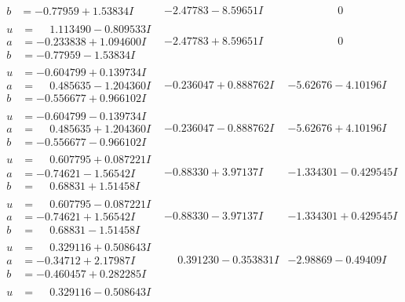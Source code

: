\documentclass[1p]{elsarticle_modified}
\theoremstyle{definition}
\begin{document}
$$\begin{array}{c|c|c}
\begin{aligned}
b &= -0.77959 + 1.53834 I\end{aligned}
 & -2.47783 - 8.59651 I & \phantom{-0.000000 } 0 \\ \hline\begin{aligned}
u &= \phantom{-}1.113490 - 0.809533 I \\
a &= -0.233838 + 1.094600 I \\
b &= -0.77959 - 1.53834 I\end{aligned}
 & -2.47783 + 8.59651 I & \phantom{-0.000000 } 0 \\ \hline\begin{aligned}
u &= -0.604799 + 0.139734 I \\
a &= \phantom{-}0.485635 - 1.204360 I \\
b &= -0.556677 + 0.966102 I\end{aligned}
 & -0.236047 + 0.888762 I & -5.62676 - 4.10196 I \\ \hline\begin{aligned}
u &= -0.604799 - 0.139734 I \\
a &= \phantom{-}0.485635 + 1.204360 I \\
b &= -0.556677 - 0.966102 I\end{aligned}
 & -0.236047 - 0.888762 I & -5.62676 + 4.10196 I \\ \hline\begin{aligned}
u &= \phantom{-}0.607795 + 0.087221 I \\
a &= -0.74621 - 1.56542 I \\
b &= \phantom{-}0.68831 + 1.51458 I\end{aligned}
 & -0.88330 + 3.97137 I & -1.334301 - 0.429545 I \\ \hline\begin{aligned}
u &= \phantom{-}0.607795 - 0.087221 I \\
a &= -0.74621 + 1.56542 I \\
b &= \phantom{-}0.68831 - 1.51458 I\end{aligned}
 & -0.88330 - 3.97137 I & -1.334301 + 0.429545 I \\ \hline\begin{aligned}
u &= \phantom{-}0.329116 + 0.508643 I \\
a &= -0.34712 + 2.17987 I \\
b &= -0.460457 + 0.282285 I\end{aligned}
 & \phantom{-}0.391230 - 0.353831 I & -2.98869 - 0.49409 I \\ \hline\begin{aligned}
u &= \phantom{-}0.329116 - 0.508643 I \\

\end{aligned}
\end{array}$$
\end{document}
